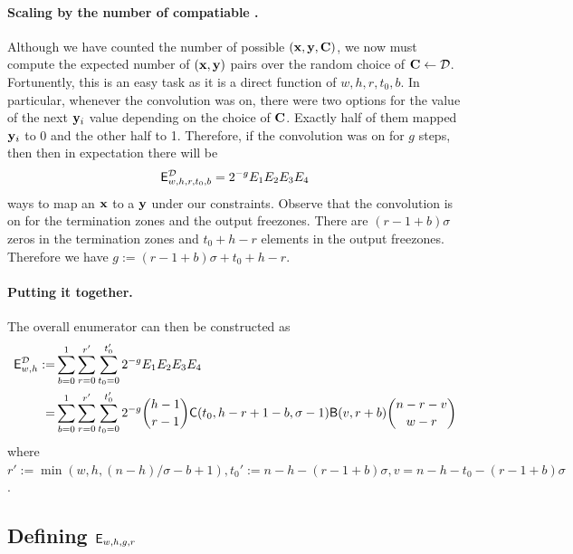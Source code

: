 \paragraph{Scaling by the number of compatiable \C.} Although we have counted the number of possible $(\mathbf{x},\mathbf{y},\mathbf{C})$, we now must compute the expected number of $(\mathbf{x},\mathbf{y})$ pairs over the random choice of $\mathbf{C}\gets \mathcal{D}$. Fortunently, this is an easy task as it is a direct function of $w,h,r,t_0,b$. In particular, whenever the convolution was on, there were two options for the value of the next $\mathbf{y}_i$ value depending on the choice of $\mathbf{C}$. Exactly half of them mapped $\mathbf{y}_i$ to 0 and the other half to 1. Therefore, if the convolution was on for $g$ steps, then then in expectation there will be
$$
\mathsf{E}^\mathcal{D}_{w,h,r,t_0,b}=2^{-g}E_1E_2E_3E_4
$$
ways to map an $\mathbf{x}$ to a $\mathbf{y}$ under our constraints. Observe that the convolution is on for the termination zones and the output freezones. There are $(r-1+b)\sigma$ zeros in the termination zones and $t_0+h-r$ elements in the output freezones. Therefore we have $g:=(r-1+b)\sigma+t_0+h-r$.


\paragraph{Putting it together.}
The overall enumerator can then be constructed as
\begin{align*}
    \mathsf{E}^\mathcal{D}_{w,h} :=&\sum_{b=0}^1 \sum_{r=0}^{r'} \sum_{t_0=0}^{t_0'}2^{-g}E_1E_2E_3E_4\\
    =&\sum_{b=0}^1 \sum_{r=0}^{r'} \sum_{t_0=0}^{t_0'}2^{-g}\binom{h-1}{r-1}\mathsf{C}(t_0, h-r + 1-b, \sigma-1)\mathsf{B}(v,r+b)\binom{n-r-v}{w-r}
\end{align*}
where $r':=\min(w,h,(n-h)/\sigma -b+1),t_0':=n-h-(r-1+b)\sigma, v=n-h-t_0-(r-1+b)\sigma$.






\fi






\iffalse


\subsection{Defining $\mathsf{E}_{w,h,g,r}$}


